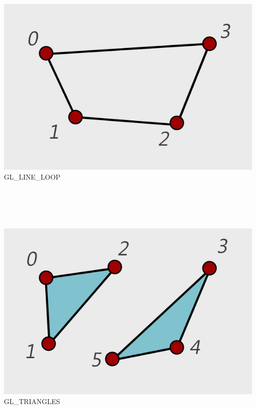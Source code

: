 \documentclass{beamer}
\begin{document}
\begin{frame}
\begin{columns}
\begin{column}{0.3\textwidth}
		\centering	
		\includegraphics[width=\textwidth]{img/GL_LINE_LOOP}
		\\ { GL\_LINE\_LOOP}
	\end{column}
\end{columns}
~\\
~\\
\pause
\begin{columns}
	\begin{column}{0.3\textwidth}
		\centering		
		\includegraphics[width=\textwidth]{img/GL_TRIANGLES}
		\\ { GL\_TRIANGLES}
	\end{column}

\end{columns}
\end{frame}
\end{document}
